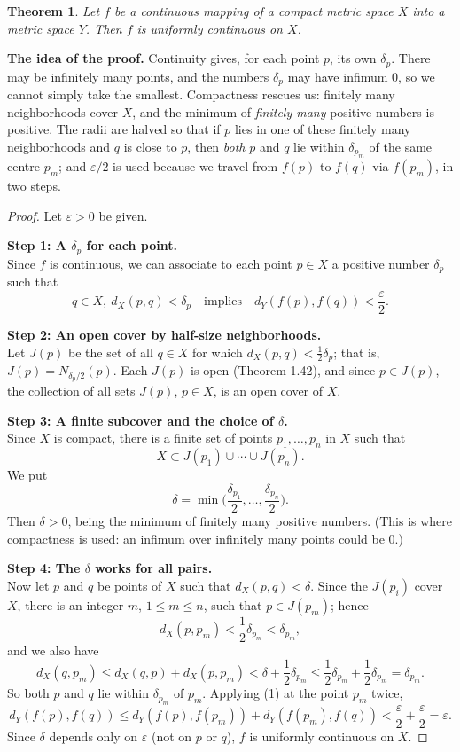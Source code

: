 \documentclass{article}
\theoremstyle{mythm}
\newtheorem{theorem}{Theorem}[section]
\begin{document}
\begin{theorem}\label{thm:unifcompact}
Let $f$ be a continuous mapping of a compact metric space $X$ into a metric space $Y$. Then $f$ is uniformly continuous on $X$.
\end{theorem}

\textbf{The idea of the proof.} Continuity gives, for each point $p$, its own $\delta_p$. There may be infinitely many points, and the numbers $\delta_p$ may have infimum $0$, so we cannot simply take the smallest. Compactness rescues us: finitely many neighborhoods cover $X$, and the minimum of \textit{finitely many} positive numbers is positive. The radii are halved so that if $p$ lies in one of these finitely many neighborhoods and $q$ is close to $p$, then \textit{both} $p$ and $q$ lie within $\delta_{p_m}$ of the same centre $p_m$; and $\varepsilon/2$ is used because we travel from $f(p)$ to $f(q)$ via $f(p_m)$, in two steps.

\begin{proof}
Let $\varepsilon > 0$ be given.

\textbf{Step 1: A $\delta_p$ for each point.}\\
Since $f$ is continuous, we can associate to each point $p \in X$ a positive number $\delta_p$ such that
\[
q \in X, \ d_X(p,q) < \delta_p \quad \text{implies} \quad d_Y(f(p), f(q)) < \frac{\varepsilon}{2}. \tag{1}
\]

\textbf{Step 2: An open cover by half-size neighborhoods.}\\
Let $J(p)$ be the set of all $q \in X$ for which $d_X(p,q) < \frac{1}{2}\delta_p$; that is, $J(p) = N_{\delta_p/2}(p)$. Each $J(p)$ is open (Theorem 1.42), and since $p \in J(p)$, the collection of all sets $J(p)$, $p \in X$, is an open cover of $X$.

\textbf{Step 3: A finite subcover and the choice of $\delta$.}\\
Since $X$ is compact, there is a finite set of points $p_1, \dots, p_n$ in $X$ such that
\[
X \subset J(p_1) \cup \cdots \cup J(p_n).
\]
We put
\[
\delta = \min\Big( \frac{\delta_{p_1}}{2}, \dots, \frac{\delta_{p_n}}{2} \Big).
\]
Then $\delta > 0$, being the minimum of finitely many positive numbers. (This is where compactness is used: an infimum over infinitely many points could be $0$.)

\textbf{Step 4: The $\delta$ works for all pairs.}\\
Now let $p$ and $q$ be points of $X$ such that $d_X(p,q) < \delta$. Since the $J(p_i)$ cover $X$, there is an integer $m$, $1 \leq m \leq n$, such that $p \in J(p_m)$; hence
\[
d_X(p, p_m) < \frac{1}{2}\delta_{p_m} < \delta_{p_m},
\]
and we also have
\[
d_X(q, p_m) \leq d_X(q, p) + d_X(p, p_m) < \delta + \frac{1}{2}\delta_{p_m} \leq \frac{1}{2}\delta_{p_m} + \frac{1}{2}\delta_{p_m} = \delta_{p_m}.
\]
So both $p$ and $q$ lie within $\delta_{p_m}$ of $p_m$. Applying (1) at the point $p_m$ twice,
\[
d_Y(f(p), f(q)) \leq d_Y(f(p), f(p_m)) + d_Y(f(p_m), f(q)) < \frac{\varepsilon}{2} + \frac{\varepsilon}{2} = \varepsilon.
\]
Since $\delta$ depends only on $\varepsilon$ (not on $p$ or $q$), $f$ is uniformly continuous on $X$.
\end{proof}
\end{document}
